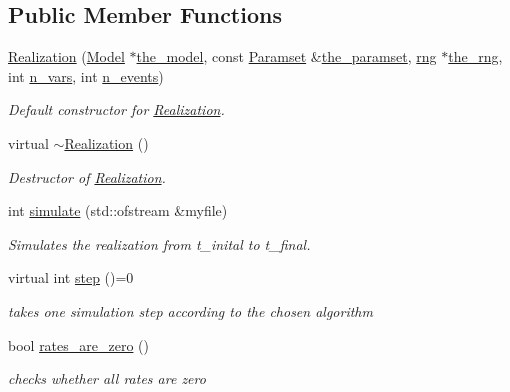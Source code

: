 \subsection*{Public Member Functions}
\begin{DoxyCompactItemize}
\item 
\hyperlink{class_realization_af4cfb6f2221bef9ba5ad09564796677f}{Realization} (\hyperlink{class_model}{Model} $\ast$\hyperlink{class_realization_a47ec1d062b8caee874b08c1a17d6aeeb}{the\+\_\+model}, const \hyperlink{class_paramset}{Paramset} \&\hyperlink{class_realization_a119bb29de88929bc51bc1b329473a94b}{the\+\_\+paramset}, \hyperlink{classrng}{rng} $\ast$\hyperlink{class_realization_ac8d358d929afae90cf5790675b6744f9}{the\+\_\+rng}, int \hyperlink{class_realization_ad9951a0829e68e12fcb3817735bb5097}{n\+\_\+vars}, int \hyperlink{class_realization_afb711282bef806fc0020f91252d1df2c}{n\+\_\+events})
\begin{DoxyCompactList}\small\item\em Default constructor for \hyperlink{class_realization}{Realization}. \end{DoxyCompactList}\item 
virtual \hyperlink{class_realization_a040c39b39c5057c668bd264b4329f2b4}{$\sim$\+Realization} ()
\begin{DoxyCompactList}\small\item\em Destructor of \hyperlink{class_realization}{Realization}. \end{DoxyCompactList}\item 
int \hyperlink{class_realization_a4e21bc7355e33c17d1401736b3c62413}{simulate} (std\+::ofstream \&myfile)
\begin{DoxyCompactList}\small\item\em Simulates the realization from t\+\_\+inital to t\+\_\+final. \end{DoxyCompactList}\item 
\mbox{\label{class_realization_a9949217117927b149850288f3b74c9ef}} 
virtual int \hyperlink{class_realization_a9949217117927b149850288f3b74c9ef}{step} ()=0
\begin{DoxyCompactList}\small\item\em takes one simulation step according to the chosen algorithm \end{DoxyCompactList}\item 
bool \hyperlink{class_realization_a48953442ebf235cd1e02731c7419f65f}{rates\+\_\+are\+\_\+zero} ()
\begin{DoxyCompactList}\small\item\em checks whether all rates are zero \end{DoxyCompactList}\item 

\end{DoxyCompactItemize}
